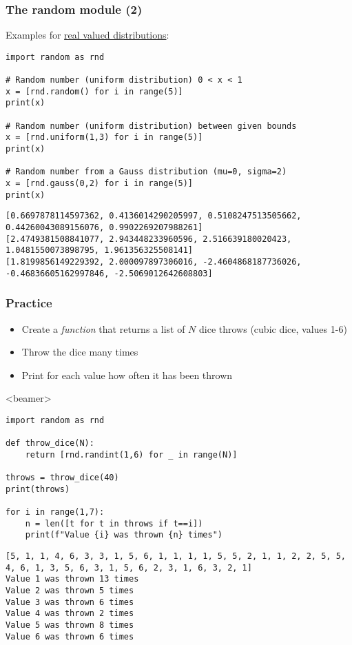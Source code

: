 \begin{frame}[fragile]
  \frametitle{The random module (2)}
  Examples for \href{https://docs.python.org/3/library/random.html#real-valued-distributions}{real valued distributions}:
  \begin{lstlisting}
import random as rnd

# Random number (uniform distribution) 0 < x < 1
x = [rnd.random() for i in range(5)]
print(x)

# Random number (uniform distribution) between given bounds
x = [rnd.uniform(1,3) for i in range(5)]
print(x)

# Random number from a Gauss distribution (mu=0, sigma=2)
x = [rnd.gauss(0,2) for i in range(5)]
print(x)
  \end{lstlisting}\pause

  \begin{lstlisting}[style=PyOutput,basicstyle=\tiny\ttfamily]
[0.6697878114597362, 0.4136014290205997, 0.5108247513505662, 0.44260043089156076, 0.9902269207988261]
[2.4749381508841077, 2.943448233960596, 2.516639180020423, 1.0481550073898795, 1.961356325508141]
[1.8199856149229392, 2.000097897306016, -2.4604868187736026, -0.46836605162997846, -2.5069012642608803]
  \end{lstlisting}
\end{frame}
  
\begin{frame}[fragile]
  \frametitle{Practice}
  \begin{itemize}
    \item Create a \emph{function} that returns a list of $N$ dice throws (cubic dice, values 1-6)
    \item Throw the dice many times
    \item Print for each value how often it has been thrown
  \end{itemize} \pause
  \begin{onlyenv}<beamer>
    \begin{lstlisting}
import random as rnd

def throw_dice(N):
    return [rnd.randint(1,6) for _ in range(N)]

throws = throw_dice(40)
print(throws)

for i in range(1,7):
    n = len([t for t in throws if t==i])
    print(f"Value {i} was thrown {n} times")
        \end{lstlisting}\pause
  \end{onlyenv}
  \begin{lstlisting}[style=PyOutput,basicstyle=\tiny\ttfamily]
[5, 1, 1, 4, 6, 3, 3, 1, 5, 6, 1, 1, 1, 1, 5, 5, 2, 1, 1, 2, 2, 5, 5, 4, 6, 1, 3, 5, 6, 3, 1, 5, 6, 2, 3, 1, 6, 3, 2, 1]
Value 1 was thrown 13 times
Value 2 was thrown 5 times
Value 3 was thrown 6 times
Value 4 was thrown 2 times
Value 5 was thrown 8 times
Value 6 was thrown 6 times
  \end{lstlisting}
\end{frame}

